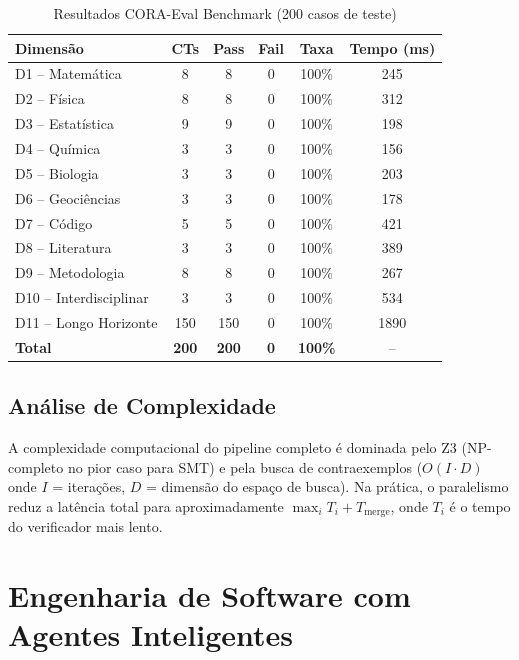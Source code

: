 \documentclass[12pt,a4paper,sumario=tradicional]{abntex2}
\begin{document}
\begin{table}[H]
\centering
\caption{Resultados CORA-Eval Benchmark (200 casos de teste)}
\label{tab:cora-full}
\begin{tabular}{@{}lccccc@{}}
\toprule
\textbf{Dimensão} & \textbf{CTs} & \textbf{Pass} & \textbf{Fail} & \textbf{Taxa} & \textbf{Tempo (ms)} \\
\midrule
D1 -- Matemática & 8 & 8 & 0 & 100\% & 245 \\
D2 -- Física & 8 & 8 & 0 & 100\% & 312 \\
D3 -- Estatística & 9 & 9 & 0 & 100\% & 198 \\
D4 -- Química & 3 & 3 & 0 & 100\% & 156 \\
D5 -- Biologia & 3 & 3 & 0 & 100\% & 203 \\
D6 -- Geociências & 3 & 3 & 0 & 100\% & 178 \\
D7 -- Código & 5 & 5 & 0 & 100\% & 421 \\
D8 -- Literatura & 3 & 3 & 0 & 100\% & 389 \\
D9 -- Metodologia & 8 & 8 & 0 & 100\% & 267 \\
D10 -- Interdisciplinar & 3 & 3 & 0 & 100\% & 534 \\
D11 -- Longo Horizonte & 150 & 150 & 0 & 100\% & 1890 \\
\midrule
\textbf{Total} & \textbf{200} & \textbf{200} & \textbf{0} & \textbf{100\%} & -- \\
\bottomrule
\end{tabular}
\end{table}

\section{Análise de Complexidade}

A complexidade computacional do pipeline completo é dominada pelo Z3 (NP-completo no pior caso para SMT) e pela busca de contraexemplos ($O(I \cdot D)$ onde $I$ = iterações, $D$ = dimensão do espaço de busca). Na prática, o paralelismo reduz a latência total para aproximadamente $\max_i T_i + T_{\text{merge}}$, onde $T_i$ é o tempo do verificador mais lento.

\chapter{Engenharia de Software com Agentes Inteligentes}
\end{document}
